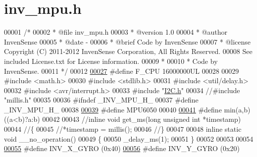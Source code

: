 \hypertarget{inv__mpu_8h_source}{}\section{inv\+\_\+mpu.\+h}
\label{inv__mpu_8h_source}

\begin{DoxyCode}
00001 \textcolor{comment}{/*}
00002 \textcolor{comment}{* @file inv\_mpu.h}
00003 \textcolor{comment}{* @version 1.0}
00004 \textcolor{comment}{* @author InvenSense}
00005 \textcolor{comment}{* @date -}
00006 \textcolor{comment}{* @brief Code by InvenSense}
00007 \textcolor{comment}{* @license Copyright (C) 2011-2012 InvenSense Corporation, All Rights Reserved.}
00008 \textcolor{comment}{             See included License.txt for License information.}
00009 \textcolor{comment}{ *}
00010 \textcolor{comment}{ * Code by InvenSense.}
00011 \textcolor{comment}{ */}
00012  
\hypertarget{inv__mpu_8h_source.tex_l00027}{}\hyperlink{group___d_r_i_v_e_r_s_ga43bafb28b29491ec7f871319b5a3b2f8}{00027} \textcolor{preprocessor}{#define F\_CPU 16000000UL}
00028 
00029 \textcolor{preprocessor}{#include <math.h>}
00030 \textcolor{preprocessor}{#include <stdlib.h>}
00031 \textcolor{preprocessor}{#include <util/delay.h>}
00032 \textcolor{preprocessor}{#include <avr/interrupt.h>}
00033 \textcolor{preprocessor}{#include "\hyperlink{_i2_c_8h}{I2C.h}"}
00034 \textcolor{comment}{//#include "millis.h"}
00035 
00036 \textcolor{preprocessor}{#ifndef \_INV\_MPU\_H\_}
00037 \textcolor{preprocessor}{#define \_INV\_MPU\_H\_}
00038 
\hypertarget{inv__mpu_8h_source.tex_l00039}{}\hyperlink{group___d_r_i_v_e_r_s_ga6d132f914f18cb144a0eaf36312045c8}{00039} \textcolor{preprocessor}{#define MPU6050}
00040 
\hypertarget{inv__mpu_8h_source.tex_l00041}{}\hyperlink{group___d_r_i_v_e_r_s_gac6afabdc09a49a433ee19d8a9486056d}{00041} \textcolor{preprocessor}{#define min(a,b) ((a<b)?a:b)}
00042 
00043 \textcolor{comment}{//inline void get\_ms(long unsigned int *timestamp)}
00044 \textcolor{comment}{//\{}
00045     \textcolor{comment}{//*timestamp = millis();}
00046 \textcolor{comment}{//\}}
00047 
00048 \textcolor{keyword}{inline} \textcolor{keyword}{static} \textcolor{keywordtype}{void} \_\_no\_operation()
00049 \{
00050     \_delay\_ms(1);
00051 \}
00052 
00053 
00054 
\hypertarget{inv__mpu_8h_source.tex_l00055}{}\hyperlink{group___d_r_i_v_e_r_s_gabf02bf28541421d59f8be764f2b95407}{00055} \textcolor{preprocessor}{#define INV\_X\_GYRO      (0x40)}
\hypertarget{inv__mpu_8h_source.tex_l00056}{}\hyperlink{group___d_r_i_v_e_r_s_gacdd8ff833a34dba08ca2aa145eb92b44}{00056} \textcolor{preprocessor}{#define INV\_Y\_GYRO      (0x20)}

\end{DoxyCode}
